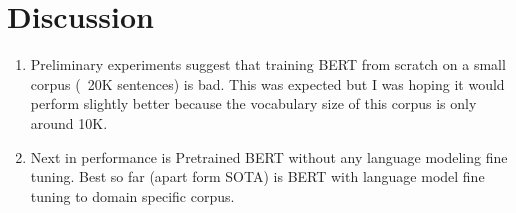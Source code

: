 \section{Discussion}
\label{sec:discussion}

\begin{enumerate}
	\item Preliminary experiments suggest that training BERT from scratch on a small corpus (~20K sentences) is bad. This was expected but I was hoping it would perform slightly better because the vocabulary size of this corpus is only around 10K.
	\item Next in performance is Pretrained BERT without any language modeling fine tuning. Best so far (apart form SOTA) is BERT with language model fine tuning to domain specific corpus.
\end{enumerate}